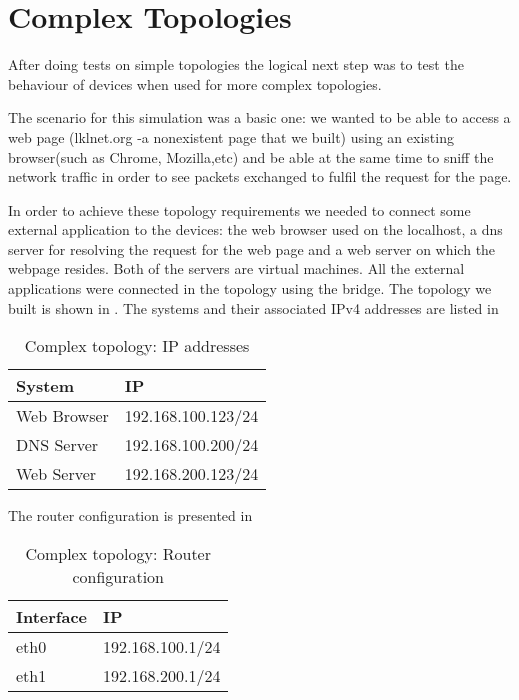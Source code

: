 \section{Complex Topologies}
\label{sec:complex-top}
After doing tests on simple topologies the logical next step was to test the behaviour of \project devices when used for more complex topologies. 

The scenario for this simulation was a basic one: we wanted to be able to access a web page 
(lklnet.org -a nonexistent page that we built) using an existing browser(such as Chrome, Mozilla,etc) 
and be able at the same time to sniff the network traffic in order to see packets exchanged to fulfil the request for the page.

In order to achieve these topology requirements we needed to connect some external application to 
the \project devices: the web browser used on the localhost, a dns server for resolving the request for 
the web page and a web server on which the webpage resides. Both of the servers are virtual machines.
All the external applications were connected in the topology using the bridge.  
The topology we built is shown in .
The systems and their associated IPv4 addresses are listed in 
\begin{center}
  \begin{table}[htb]
  \begin{center}
  \begin{tabular}{| l | l |}
	\hline
	System & IP \\ \hline
	Web Browser & 192.168.100.123/24 \\ \hline
	DNS Server & 192.168.100.200/24 \\ \hline
	Web Server & 192.168.200.123/24 \\	 
    \hline
  \end{tabular}
  \end{center}
  \caption{Complex topology: IP addresses}
  \label{table:complex-ip}
  \end{table}
\end{center}
The router configuration is presented in 
\begin{center}
  \begin{table}[htb]
  \begin{center}
  \begin{tabular}{| l | l |}
	\hline
	Interface & IP \\ \hline
	eth0 & 192.168.100.1/24 \\ \hline
	eth1 & 192.168.200.1/24 \\	 
    \hline
  \end{tabular}
  \end{center}
  \caption{Complex topology: Router configuration}
  \label{table:complex-router}
  \end{table}
\end{center}
